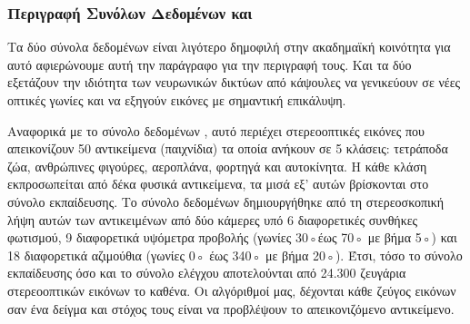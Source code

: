 \begin{table}[h]
    \begin{center}
        \end{center}
        \caption{\label{tab:exp_datasets} Πίνακας που συγκεντρώνει το καλύτερο μοντέλο και την απόδοσή του, για κάθε σύνολο δεδομένων.}
    \end{table}
    \subsubsection{Περιγραφή Συνόλων Δεδομένων  και }
    Τα δύο σύνολα δεδομένων είναι λιγότερο δημοφιλή στην ακαδημαϊκή κοινότητα για αυτό αφιερώνουμε αυτή την παράγραφο για την περιγραφή τους. Και τα δύο εξετάζουν την ιδιότητα των νευρωνικών δικτύων από κάψουλες να γενικεύουν σε νέες οπτικές γωνίες και να εξηγούν εικόνες με σημαντική επικάλυψη.\par

    Αναφορικά με το σύνολο δεδομένων , αυτό περιέχει στερεο\textendash οπτικές εικόνες που απεικονίζουν 50 αντικείμενα (παιχνίδια) τα οποία ανήκουν σε 5 κλάσεις: τετράποδα ζώα, ανθρώπινες φιγούρες, αεροπλάνα, φορτηγά και αυτοκίνητα. Η κάθε κλάση εκπροσωπείται από δέκα φυσικά αντικείμενα, τα μισά εξ' αυτών βρίσκονται στο σύνολο εκπαίδευσης. Το σύνολο δεδομένων δημιουργήθηκε από τη στερεοσκοπική λήψη αυτών των αντικειμένων από δύο κάμερες υπό 6 διαφορετικές συνθήκες φωτισμού, 9 διαφορετικά υψόμετρα προβολής (γωνίες 30◦έως 70◦ με βήμα 5◦) και 18 διαφορετικά αζιμούθια (γωνίες 0◦ έως 340◦ με βήμα 20◦). Έτσι, τόσο το σύνολο εκπαίδευσης όσο και το σύνολο ελέγχου αποτελούνται από 24.300 ζευγάρια στερεο\textendash οπτικών εικόνων το καθένα. Οι αλγόριθμοί μας, δέχονται κάθε ζεύγος εικόνων σαν ένα δείγμα και στόχος τους είναι να προβλέψουν το απεικονιζόμενο αντικείμενο.\par

